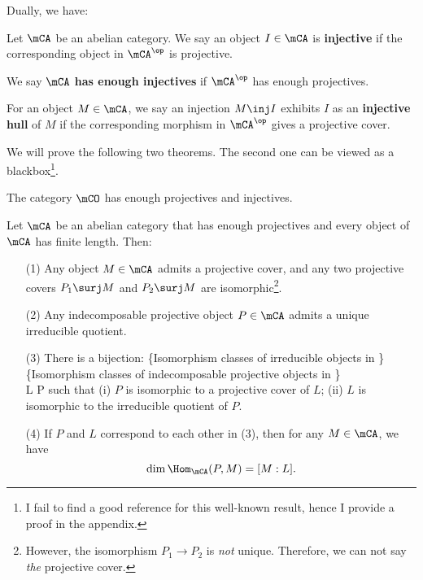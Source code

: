	Dually, we have:

	\begin{defn}
		Let $\mCA$ be an abelian category. We say an object $I\in \mCA$ is \textbf{injective} if the corresponding object in $\mCA^\op$ is projective.
		

		We say $\mCA$ \textbf{has enough injectives} if $\mCA^\op$ has enough projectives.

		For an object $M\in \mCA$, we say an injection $M\inj I$ exhibits $I$ as an \textbf{injective hull} of $M$ if the corresponding morphism in $\mCA^\op$ gives a projective cover.
	\end{defn}

	We will prove the following two theorems. The second one can be viewed as a blackbox\footnote{I fail to find a good reference for this well-known result, hence I provide a proof in the appendix.}.

	\begin{thm}
		\label{thm-enough-proj}
		The category $\mCO$ has enough projectives and injectives.
	\end{thm}

	\begin{thm}
		\label{thm-proj-cover-artinian}
		Let $\mCA$ be an abelian category that has enough projectives and every object of $\mCA$ has finite length. Then:
		\begin{itemize}
			\item[(1)]
				Any object $M\in \mCA$ admits a projective cover, and any two projective covers $P_1\surj M$ and $P_2\surj M$ are isomorphic\footnote{However, the isomorphism $P_1\to P_2$ is \emph{not} unique. Therefore, we can not say \emph{the} projective cover.}.
			\item[(2)]
				Any indecomposable projective object $P\in \mCA$ admits a unique irreducible quotient.
			\item[(3)]
				There is a bijection:
				\blongeqn
					\left\{\textrm{Isomorphism classes of irreducible objects in }\mCA \right\} \simeq \\
					\left\{\textrm{Isomorphism classes of indecomposable projective objects in }\mCA \right\} \\
					L \longleftrightarrow P
				\elongeqn
				such that (i) $P$ is isomorphic to a projective cover of $L$; (ii) $L$ is isomorphic to the irreducible quotient of $P$.
			\item[(4)]
				If $P$ and $L$ correspond to each other in (3), then for any $M\in \mCA$, we have
				\[
					\dim \Hom_\mCA(P,M) = [M:L].
				\]
		\end{itemize}
	\end{thm}

